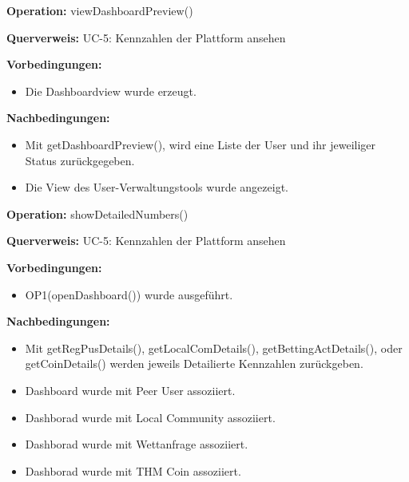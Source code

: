\documentclass[a4paper,12pt]{article}
\begin{document}
	\begin{contractbox}
		\textbf{Operation:} viewDashboardPreview()
		
			\textbf{Querverweis:} UC-5: Kennzahlen der Plattform ansehen
		
		\textbf{Vorbedingungen:}
		\begin{itemize}[noitemsep]
			\item Die Dashboardview wurde erzeugt.
		\end{itemize}
		
		\textbf{Nachbedingungen:}
		\begin{itemize}[noitemsep]
			\item Mit getDashboardPreview(), wird eine Liste der User und ihr jeweiliger Status zurückgegeben.
			\item Die View des User-Verwaltungstools wurde angezeigt.
		\end{itemize}
	\end{contractbox}

	\begin{contractbox}
		\textbf{Operation:} showDetailedNumbers()
		
			\textbf{Querverweis:} UC-5: Kennzahlen der Plattform ansehen
		
		\textbf{Vorbedingungen:}
		\begin{itemize}[noitemsep]
			\item OP1(openDashboard()) wurde ausgeführt.
		\end{itemize}
		
		\textbf{Nachbedingungen:}
		\begin{itemize}[noitemsep]
			\item Mit getRegPusDetails(), getLocalComDetails(), getBettingActDetails(), oder getCoinDetails() werden jeweils Detailierte Kennzahlen zurückgeben.
			\item Dashboard wurde mit Peer User assoziiert.
			\item Dashborad wurde mit Local Community assoziiert.
			\item Dashborad wurde mit Wettanfrage assoziiert.
			\item Dashborad wurde mit THM Coin assoziiert.
		\end{itemize}
	\end{contractbox}
\end{document}
